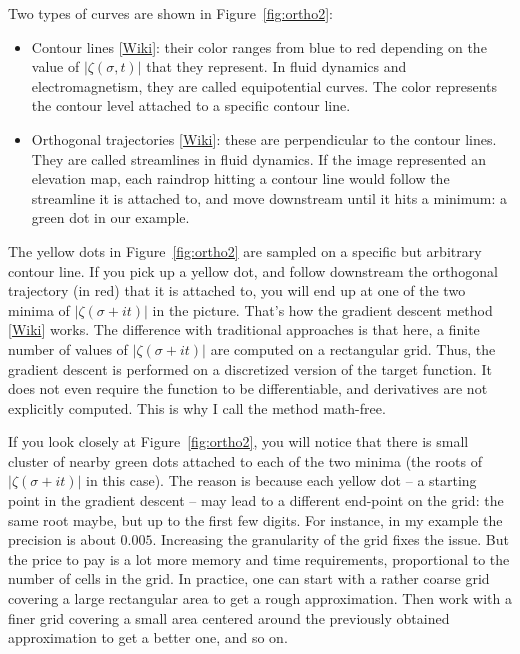 \documentclass[oneside,10pt]{book}
\begin{document}
\noindent Two types of curves are shown in Figure~\ref{fig:ortho2}:\vspace{1ex}
\begin{itemize}
\item \textcolor{index}{Contour lines} [\href{https://en.wikipedia.org/wiki/Contour_line}{Wiki}]: their color ranges from blue to red depending on the value of $|\zeta(\sigma,t)|$ that they represent. In fluid dynamics and electromagnetism, they are called equipotential curves. The color represents the \textcolor{index}{contour level} attached to a specific contour line. 
\item \textcolor{index}{Orthogonal trajectories} [\href{https://en.wikipedia.org/wiki/Orthogonal_trajectory}{Wiki}]: these are perpendicular to the contour lines. They are called streamlines in fluid dynamics. If the image represented an elevation map, each raindrop hitting a contour line would follow the streamline it is attached to, and move downstream until it hits a minimum: a green dot in our example. 
\end{itemize}\vspace{1ex}

\noindent The yellow dots in Figure~\ref{fig:ortho2} are sampled on a specific but arbitrary contour line. If you pick up a yellow dot, and follow downstream the orthogonal trajectory (in red) that it is attached to, you will end up at one of the two minima of $|\zeta(\sigma+it)|$ in the picture.  That's how the \textcolor{index}{gradient descent method} [\href{https://en.wikipedia.org/wiki/Gradient_descent}{Wiki}] works. The difference with traditional approaches is that here, a finite number of values of $|\zeta(\sigma+it)|$ are computed on a 
 rectangular grid. Thus, the gradient descent is performed on a discretized version of the target function. It does not even require the function to be differentiable, and derivatives are not explicitly computed. This is why I call the method math-free.

If you look closely at Figure~\ref{fig:ortho2}, you will notice that there is small cluster of nearby green dots attached to each of the two minima (the roots of $|\zeta(\sigma+it)|$ in this case). The reason is because each yellow dot -- a starting point in the gradient descent -- may lead to a different end-point on the grid: the same root maybe, but up to the first few digits. For instance, in my example the precision is about $0.005$.
Increasing the granularity of the grid 
 fixes the issue. But the price to pay is a lot more memory and time requirements, proportional to the number of cells in the grid.  In practice, one can start with a rather coarse grid 
 covering a large rectangular area to get
 a rough approximation. Then work with a finer grid covering a small area centered around the previously obtained approximation to get a better one, and so on.   
\end{document}
